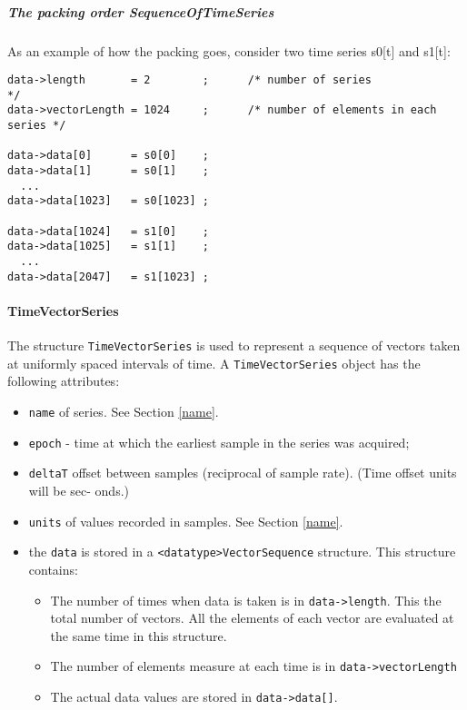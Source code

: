 \documentclass[]{ligodcc}
\renewcommand{\texttt}[1]{{\ttfamily\color{blue}#1}}
\begin{document}
\subparagraph{The packing order {\texttt {SequenceOfTimeSeries}} \\}
\label{packingorder}

As an example of how the packing goes, consider two time series s0[t] and s1[t]:

{\footnotesize
\begin{verbatim}
data->length       = 2        ;      /* number of series                  */
data->vectorLength = 1024     ;      /* number of elements in each series */

data->data[0]      = s0[0]    ;
data->data[1]      = s0[1]    ;
  ...
data->data[1023]   = s0[1023] ;

data->data[1024]   = s1[0]    ;
data->data[1025]   = s1[1]    ;
  ...
data->data[2047]   = s1[1023] ;
\end{verbatim}}


\paragraph{{\texttt {TimeVectorSeries}}  \\}

The structure {\tt TimeVectorSeries} is used to represent a sequence of
vectors taken at uniformly spaced intervals of time. A
{\tt TimeVectorSeries} object has the following attributes:

\begin{itemize}
\vspace{-0.15in}
\item
{\tt name} of series. See Section \ref{name}.
\vspace{-0.15in}
\item
{\tt epoch} - time at which the earliest sample in the series was acquired;
\vspace{-0.15in}
\item
{\tt deltaT} offset between samples (reciprocal of sample rate).  (Time
offset units will be sec- onds.)
\vspace{-0.15in}
\item
{\tt units} of values recorded in samples. See Section \ref{name}.
\vspace{-0.15in}
\item
the {\tt data} is stored in a {\tt <datatype>VectorSequence}  structure.
This structure contains: 
\begin{itemize}
\vspace{-0.15in}
\item
The number of times when data is taken is in {\tt data->length}. This the
total number of vectors. All the elements of each vector are evaluated at the 
same time in this structure.
\item
The number of elements measure at each time is in {\tt data->vectorLength}
\item
The  actual data  values are stored in {\tt data->data[]}.
\end{itemize}
\end{itemize}
\end{document}
